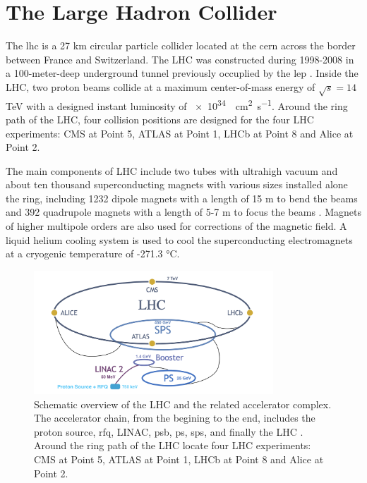 
\section{The Large Hadron Collider}
\label{sec:cmsexperiment:lhc}

The \acrfull{lhc} \cite{exhep:lhc:Evans:2008zzb} is a 27 km circular particle collider located at the \acrfull{cern} across the border between France and Switzerland. The LHC was constructed during 1998-2008 in a 100-meter-deep underground tunnel previously occuplied by the \acrfull{lep} \cite{exhep:lep:Myers:1991ym}. Inside the LHC, two proton beams collide at a maximum center-of-mass energy of $\sqrt{s}=14$ TeV with a designed instant luminosity of \SI{e34}{\per\cm\squared \per\s}. Around the ring path of the LHC, four collision positions are designed for the four LHC experiments: CMS \cite{exhep:cms:Chatrchyan:2008aa} at Point 5, ATLAS \cite{exhep:atlas:Aad:2008zzm} at Point 1, LHCb \cite{exhep:lhcb:Alves:2008zz} at Point 8 and Alice \cite{exhep:alice:Aamodt:2008zz} at Point 2.


The main components of LHC include two tubes with ultrahigh vacuum and about ten thousand superconducting magnets with various sizes installed alone the ring, including 1232 dipole magnets with a length of 15 m to bend the beams and 392 quadrupole magnets with a length of 5-7 m to focus the beams \cite{exhep:lhcFactsFigures}. Magnets of higher multipole orders are also used for corrections of the magnetic field. A liquid helium cooling system is used to cool the superconducting electromagnets at a cryogenic temperature of -271.3 \si{\degreeCelsius}. 


\begin{figure}[ht]
    \centering
    \includegraphics[width=0.8\textwidth]{chapters/CMSExperiment/sectionLHC/figures/lhc.png}
    \caption{Schematic overview of the LHC and the related accelerator complex. The accelerator chain, from the begining to the end, includes the proton source, \acrfull{rfq}, LINAC, \acrfull{psb}, \acrfull{ps}, \acrfull{sps}, and finally the LHC \cite{exhep:lhcInject:Benedikt:2004wm}. Around the ring path of the LHC locate four LHC experiments: CMS \cite{exhep:cms:Chatrchyan:2008aa} at Point 5, ATLAS \cite{exhep:atlas:Aad:2008zzm} at Point 1, LHCb \cite{exhep:lhcb:Alves:2008zz} at Point 8 and Alice \cite{exhep:alice:Aamodt:2008zz} at Point 2.}
    \label{fig:cmsexperiment:lhc:map}
\end{figure}

